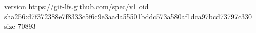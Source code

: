 version https://git-lfs.github.com/spec/v1
oid sha256:d7f372388e7f8333c5f6c9e3aada55501bddc573a580af1dca97bcd73797c330
size 70893
